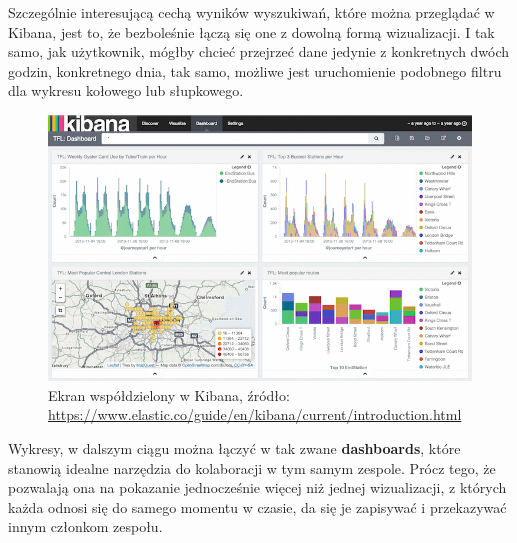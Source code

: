     Szczególnie interesującą cechą wyników wyszukiwań, które można przeglądać w Kibana, jest to, że bezboleśnie
    łączą się one z dowolną formą wizualizacji. I tak samo, jak użytkownik, mógłby chcieć przejrzeć dane 
    jedynie z konkretnych dwóch godzin, konkretnego dnia, tak samo, możliwe jest uruchomienie podobnego
    filtru dla wykresu kołowego lub słupkowego.
    \begin{figure}[H]
        \centering
        \includegraphics[width=1.0\textwidth]{images/kibana_dashboards}
        \caption[Ekran współdzielony w Kibana]{
            Ekran współdzielony w Kibana, źródło: \url{https://www.elastic.co/guide/en/kibana/current/introduction.html}
        }
        \label{chapter:application:elkstack:kibana:dashboard}
    \end{figure}
    Wykresy, w dalszym ciągu można łączyć w tak zwane \textbf{dashboards}, które stanowią idealne narzędzia do kolaboracji
    w tym samym zespole. Prócz tego, że pozwalają ona na pokazanie jednocześnie więcej niż jednej wizualizacji, z których
    każda odnosi się do samego momentu w czasie, da się je zapisywać i przekazywać innym członkom zespołu. 